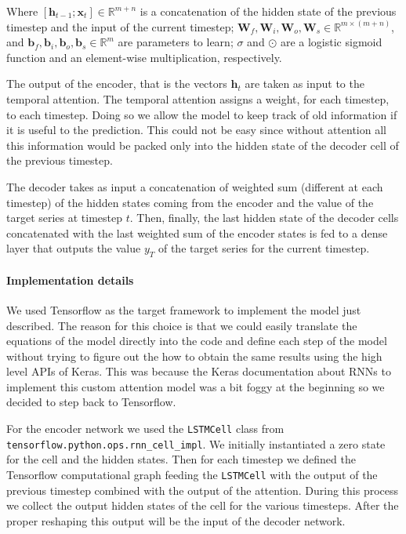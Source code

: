 \documentclass{article}
\begin{document}
Where $[\mathbf{h}_{t-1};\mathbf{x}_t] \in \mathbb{R}^{m + n}$ is a 
concatenation of the hidden state of the previous 
timestep and the input of the current timestep; 
$\mathbf{W}_f,\mathbf{W}_i,\mathbf{W}_o,\mathbf{W}_s 
\in \mathbb{R}^{m \times(m+n)}$, and $\mathbf{b}_f, \mathbf{b}_i, 
\mathbf{b}_o,\mathbf{b}_s \in \mathbb{R}^m$ are 
parameters to learn; $\sigma$ and $\odot$ are a logistic sigmoid function and 
an element-wise multiplication,
respectively.

The output of the encoder, that is the vectors $\mathbf{h}_t$ are taken as 
input to the temporal attention.
The temporal attention assigns a weight, for each timestep, to each timestep. 
Doing so we allow the model to keep
track of old information if it is useful to the prediction. This could not be 
easy since without attention all this 
information would be packed only into the hidden state of the decoder cell of 
the previous timestep.

The decoder takes as input a concatenation of weighted sum (different at each 
timestep) of the hidden states coming 
from the encoder and the value of the target series at timestep $t$. Then, 
finally, the last hidden state of the decoder
cells concatenated with the last weighted sum of the encoder states is fed to a 
dense layer that outputs the value 
$y_T$ of the target series for the current timestep.

\paragraph{Implementation details}

We used Tensorflow as the target framework to implement the model just 
described. The reason for this choice is that we
could easily translate the equations of the model directly into the code and 
define each step of the model without 
trying to figure out the how to obtain the same results using the high level 
APIs of Keras. This was because the 
Keras documentation about RNNs to implement this custom attention model was a 
bit foggy at the beginning so we decided
to step back to Tensorflow. 

For the encoder network we used the \texttt{LSTMCell} class from 
\texttt{tensorflow.python.ops.rnn\_cell\_impl}.
We initially instantiated a zero state for the cell and the hidden states. Then 
for each timestep we defined the 
Tensorflow computational graph feeding the \texttt{LSTMCell} with the output of 
the previous timestep combined with the
output of the attention. During this process we collect the output hidden 
states of the cell for the various timesteps.
After the proper reshaping this output will be the input of the decoder network.
\end{document}
